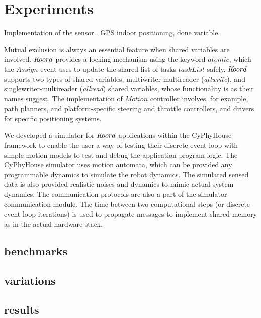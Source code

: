\section{Experiments}
Implementation of the sensor.. GPS indoor positioning, done variable. 
%

Mutual exclusion is always an essential feature when shared variables are involved. $K\kern-2pt oord$ provides a locking mechanism using the keyword $\mathit{atomic}$, which the $\mathit{Assign}$ event uses to update the shared list of tasks $\mathit{taskList}$ safely. $K\kern-2pt oord$ supports two types of shared variables, multiwriter-multireader (\emph{allwrite}), and singlewriter-multireader (\emph{allread}) shared variables, whose functionality is as their names suggest. 
The implementation of $\mathit{Motion}$ controller involves, for example, path planners, and platform-specific steering and throttle controllers, and drivers for specific positioning systems. 

We developed a simulator  for $K\kern-2pt oord$ applications within the CyPhyHouse framework to enable the user a way of testing their discrete event loop with simple motion models to test and debug the application program logic. The CyPhyHouse simulator uses motion automata, which can be provided any programmable dynamics to simulate the robot dynamics. The simulated sensed data is also provided realistic noises and dynamics to mimic actual system dynamics. The communication protocols are also a part of the simulator communication module. The time between two computational steps (or discrete event loop iterations) is used to propagate messages to implement shared memory as in the actual hardware stack.
\subsection{benchmarks}
\subsection{variations}
\subsection{results}
